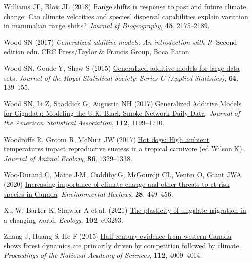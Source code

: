 \documentclass[
  12pt,
]{article}
\newlength{\cslhangindent}
\newenvironment{CSLReferences}[2] %
 {\begin{list}{}{%
  \setlength{\itemindent}{0pt}
  \setlength{\leftmargin}{0pt}
  \setlength{\parsep}{0pt}
  \ifodd #1
   \setlength{\leftmargin}{\cslhangindent}
   \setlength{\itemindent}{-1\cslhangindent}
  \fi
  \setlength{\itemsep}{#2\baselineskip}}}
 {\end{list}}
\begin{document}
\begin{CSLReferences}{1}{0}
Williams JE, Blois JL (2018) \href{https://doi.org/10.1111/jbi.13395}{Range shifts in response to past and future climate change: {Can} climate velocities and species' dispersal capabilities explain variation in mammalian range shifts?} \emph{Journal of Biogeography}, \textbf{45}, 2175--2189.

Wood SN (2017) \emph{\emph{Generalized additive models: An introduction with {R}}}, Second edition edn. CRC Press/Taylor \& Francis Group, Boca Raton.

Wood SN, Goude Y, Shaw S (2015) \href{https://doi.org/10.1111/rssc.12068}{Generalized additive models for large data sets}. \emph{Journal of the Royal Statistical Society: Series C (Applied Statistics)}, \textbf{64}, 139--155.

Wood SN, Li Z, Shaddick G, Augustin NH (2017) \href{https://doi.org/10.1080/01621459.2016.1195744}{Generalized {Additive} {Models} for {Gigadata}: {Modeling} the {U}.{K}. {Black} {Smoke} {Network} {Daily} {Data}}. \emph{Journal of the American Statistical Association}, \textbf{112}, 1199--1210.

Woodroffe R, Groom R, McNutt JW (2017) \href{https://doi.org/10.1111/1365-2656.12719}{Hot dogs: {High} ambient temperatures impact reproductive success in a tropical carnivore} (ed Wilson K). \emph{Journal of Animal Ecology}, \textbf{86}, 1329--1338.

Woo-Durand C, Matte J-M, Cuddihy G, McGourdji CL, Venter O, Grant JWA (2020) \href{https://doi.org/10.1139/er-2020-0032}{Increasing importance of climate change and other threats to at-risk species in {Canada}}. \emph{Environmental Reviews}, \textbf{28}, 449--456.

Xu W, Barker K, Shawler A et al. (2021) \href{https://doi.org/10.1002/ecy.3293}{The plasticity of ungulate migration in a changing world}. \emph{Ecology}, \textbf{102}, e03293.

Zhang J, Huang S, He F (2015) \href{https://doi.org/10.1073/pnas.1420844112}{Half-century evidence from western {Canada} shows forest dynamics are primarily driven by competition followed by climate}. \emph{Proceedings of the National Academy of Sciences}, \textbf{112}, 4009--4014.


\end{CSLReferences}
\end{document}
